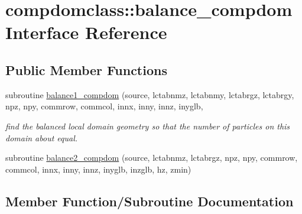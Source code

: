 \hypertarget{interfacecompdomclass_1_1balance__compdom}{}\section{compdomclass\+::balance\+\_\+compdom Interface Reference}
\label{interfacecompdomclass_1_1balance__compdom}
\subsection*{Public Member Functions}
\begin{DoxyCompactItemize}
\item 
subroutine \mbox{\hyperlink{interfacecompdomclass_1_1balance__compdom_a8dfdc2311f3acbda59cfe285e5bfe2ea}{balance1\+\_\+compdom}} (source, lctabnmz, lctabnmy, lctabrgz, lctabrgy, npz, npy, commrow, commcol, innx, inny, innz, inyglb,
\begin{DoxyCompactList}\small\item\em find the balanced local domain geometry so that the number of particles on this domain about equal. \end{DoxyCompactList}\item 
subroutine \mbox{\hyperlink{interfacecompdomclass_1_1balance__compdom_a339cc6756f770ac477ca5d635b77a75f}{balance2\+\_\+compdom}} (source, lctabnmz, lctabrgz, npz, npy, commrow, commcol, innx, inny, innz, inyglb, inzglb, hz, zmin)
\end{DoxyCompactItemize}


\subsection{Member Function/\+Subroutine Documentation}
\mbox{\label{interfacecompdomclass_1_1balance__compdom_a8dfdc2311f3acbda59cfe285e5bfe2ea}} 
